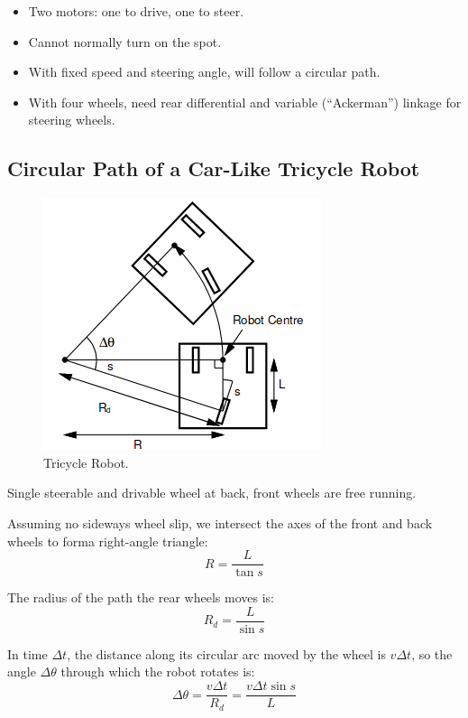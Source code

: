 \documentclass[11pt]{article}
\begin{document}
\begin{itemize}
  \item Two motors: one to drive, one to steer.
  \item Cannot normally turn on the spot.
  \item With fixed speed and steering angle, will follow a circular path.
  \item With four wheels, need rear differential and variable (``Ackerman'') linkage for steering wheels.
\end{itemize}

\subsection{Circular Path of a Car-Like Tricycle Robot}
\begin{figure}[h]
  \caption{Tricycle Robot.}
  \includegraphics[scale=0.5]{tricycle}
  \centering
\end{figure}

Single steerable and drivable wheel at back, front wheels are free running.

Assuming no sideways wheel slip, we intersect the axes of the front and back wheels to forma right-angle triangle:
\[
  R = \frac{L}{\tan s}
\]

The radius of the path the rear wheels moves is:
\[
  R_d = \frac{L}{\sin s}
\]

In time $\Delta t$, the distance along its circular arc moved by the wheel is $v\Delta t$, so the angle $\Delta \theta$ through which the robot rotates is:
\[
  \Delta \theta = \frac{v\Delta t}{R_d} = \frac{v\Delta t \sin s}{L}
\]
\end{document}
